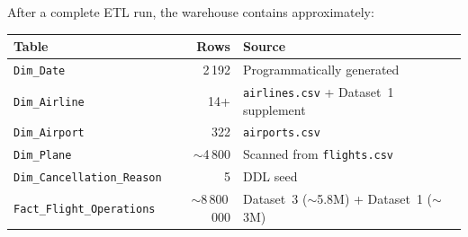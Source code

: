 \documentclass[12pt,a4paper]{article}
\begin{document}
After a complete ETL run, the warehouse contains approximately:

\begin{center}
\begin{tabular}{lrl}
\toprule
\textbf{Table} & \textbf{Rows} & \textbf{Source} \\
\midrule
\texttt{Dim\_Date}                & 2\,192       & Programmatically generated \\
\texttt{Dim\_Airline}             & 14+          & \texttt{airlines.csv} + Dataset~1 supplement \\
\texttt{Dim\_Airport}             & 322          & \texttt{airports.csv} \\
\texttt{Dim\_Plane}               & $\sim$4\,800 & Scanned from \texttt{flights.csv} \\
\texttt{Dim\_Cancellation\_Reason}& 5            & DDL seed \\
\texttt{Fact\_Flight\_Operations} & $\sim$8\,800\,000 & Dataset~3 ($\sim$5.8M) + Dataset~1 ($\sim$3M) \\
\bottomrule
\end{tabular}
\end{center}
\end{document}
